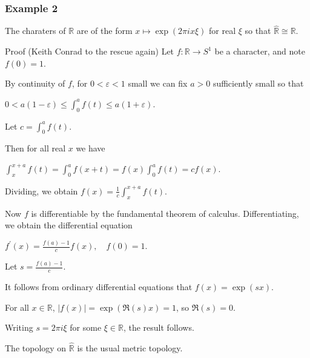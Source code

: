 \documentclass[mathserif
, handout
]{beamer}
\begin{document}
\begin{frame}
    \frametitle{Example 2}
The charaters of $\mathbb{R}$ are of the form $x\mapsto \exp(2\pi i x\xi)$ for real $\xi$ so that $\widehat{\mathbb{R}}\cong\mathbb{R}$.
\pause 
\begin{block}{Proof (Keith Conrad to the rescue again)} %
    Let $f \colon \mathbb{R}\to S^1$ be a character, and note $f(0) = 1$.\pause 

    By continuity of $f$, for $0<\varepsilon<1$ small we can fix $a>0$ sufficiently small so that \begin{center}
        $0<a(1-\varepsilon)\leq \int_0^a f(t)\leq a(1+\varepsilon)$.
    \end{center} Let $c = \int_0^a f(t)$.
\end{block}
\end{frame}

\begin{frame}
    \begin{block}{}
        Then for all real $x$ we have \begin{center}
            $\int_x^{x+a}f(t) = \int_0^a f(x+t) = f(x)\int_0^a f(t) = cf(x)$.
        \end{center} \pause 
        Dividing, we obtain $f(x) = \frac{1}{c}\int_x^{x+a}f(t)$. \pause

        Now $f$ is differentiable by the fundamental theorem of calculus. Differentiating, we obtain the differential equation \begin{center}
            $f^\prime(x) = \frac{f(a)-1}{c} f(x),\quad f(0) = 1$.
        \end{center} Let $s = \frac{f(a)-1}{c}$. \pause 

        It follows from ordinary differential equations that $f(x) = \exp(sx)$. \pause 

        For all $x\in \mathbb{R}$, $|f(x)|= \exp(\Re(s) x)=1$, so $\Re( s) = 0$. \pause 

        Writing $s = 2\pi i \xi$ for some $\xi\in \mathbb{R}$, the result follows. \pushQED{\qed}\qedhere\popQED
    \end{block} \pause The topology on $\widehat{\mathbb{R}}$ is the usual metric topology.
\end{frame}
\end{document}
